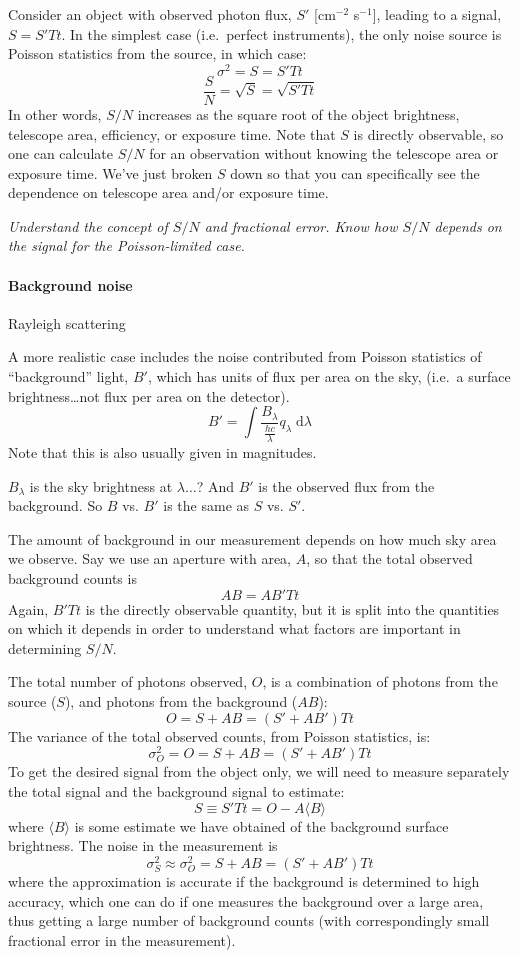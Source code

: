 \documentclass[12pt]{article}
\newcommand{\mynotes}[1]{\textcolor{myBlue}{#1}}
\newcommand{\test}[1]{%
    \begin{center}
        {\parbox{0.9\textwidth}{\textit{\small#1}}}
    \end{center}}
\begin{document}
Consider an object with observed photon flux, $S'$
[cm$^{-2}$ s$^{-1}$], leading to a signal, $S = S'Tt$.
In the simplest case (i.e.\ perfect instruments), the only noise source is
Poisson statistics from the source, in which case:
\[
    \sigma^{2} = S = S'Tt 
    \]
\[
    \frac{S}{N} = \sqrt{S} = \sqrt{S'Tt} 
    \]
In other words, $S/N$ increases as the square root of the object brightness,
telescope area, efficiency, or exposure time. Note that $S$ is directly
observable, so one can calculate $S/N$ for an observation without knowing the
telescope area or exposure time. We've just broken $S$ down so that you can
specifically see the dependence on telescope area and/or exposure time.

\test{Understand the concept of $S/N$ and fractional error. Know how $S/N$
depends on the signal for the Poisson-limited case.}

\paragraph{Background noise}
\mynotes{Rayleigh scattering}

A more realistic case includes the noise contributed from Poisson statistics of
``background'' light, $B'$, which has units of flux per area on the sky, (i.e.\
a surface brightness\ldots not flux per area on the detector).
\[
    B' = \int{ \frac{B_{\lambda}}{\frac{hc}{\lambda}}
    q_{\lambda} \;\mathrm{d}\lambda }
    \]
Note that this is also usually given in magnitudes.

\mynotes{$B_{\lambda}$ is the sky brightness at $\lambda
\ldots$? And $B'$ is the observed flux from the background.
So $B$ vs. $B'$ is the same as $S$ vs. $S'$.}

The amount of background in our measurement depends on how much sky area we
observe. Say we use an aperture with area, $A$, so that the total observed
background counts is
\[
    AB = AB'Tt
    \]
Again, $B'Tt$ is the directly observable quantity, but it is split into the
quantities on which it depends in order to understand what factors are
important in determining $S/N$.

The total number of photons observed, $O$, is a combination of
photons from the source ($S$), and photons from the background ($AB$):
\[
    O = S + AB = (S' + AB')Tt 
    \]
The variance of the total observed counts, from Poisson statistics, is:
\[
    \sigma^{2}_{O} = O =  S + AB = (S' + AB')Tt 
    \]
To get the desired signal from the object only, we will need to measure
separately the total signal and the background signal to estimate:
\[
    S \equiv S'Tt = O - A \langle B \rangle
    \]
where $ \langle B \rangle $ is some estimate we have obtained of the background
surface brightness. The noise in the measurement is
\[
    \sigma^{2}_{S} \approx \sigma^{2}_{O} = S + AB = (S' + AB')Tt
    \]
where the approximation is accurate if the background is determined to high
accuracy, which one can do if one measures the background over a large area,
thus getting a large number of background counts (with correspondingly small
fractional error in the measurement).
\end{document}
